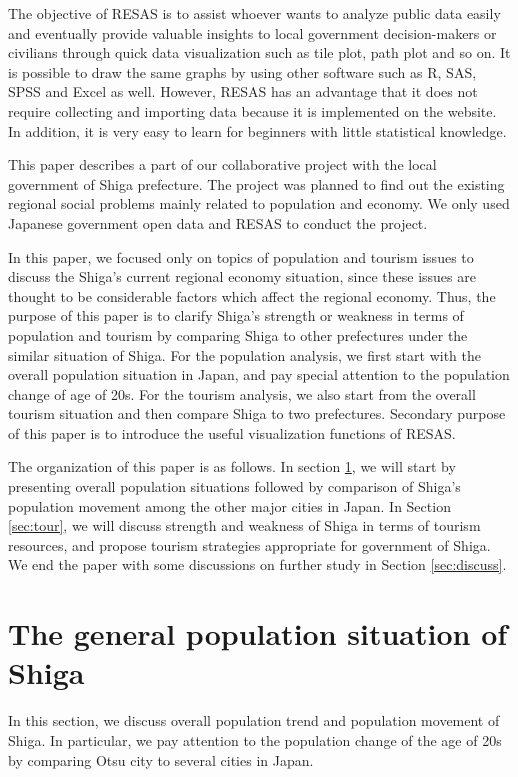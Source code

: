 \documentclass[10pt, conference, compsocconf]{IEEEtran}
\begin{document}
The objective of RESAS is to assist whoever wants to analyze public data easily\cite{resas} and eventually provide valuable insights to local government decision-makers or civilians through quick data visualization such as tile plot, path plot and so on. 
It is possible to draw the same graphs by using other software such as R, SAS, SPSS and Excel as well. However, RESAS has an advantage that it does not require collecting and importing data because it is implemented on the website. In addition, it is very easy to learn for beginners with little statistical knowledge. 

This paper describes a part of our collaborative project with the local government of Shiga prefecture. 
The project was planned to find out the existing regional social problems mainly related to population and economy. We only used Japanese government open data and RESAS to conduct the project.

In this paper, we focused only on topics of population and tourism issues to discuss the Shiga's current regional economy situation, since these issues are thought to be considerable factors 
which affect the regional economy.
Thus, the purpose of this paper is to clarify Shiga's strength or weakness in terms of  population and tourism by comparing Shiga to other prefectures under the similar situation of Shiga.
For the population analysis, we first start with the overall population situation in Japan, and pay special attention to the population change of age of 20s.
For the tourism analysis, we also start from the overall tourism situation and then compare Shiga to two prefectures.
Secondary purpose of this paper is to introduce the useful 
visualization functions of RESAS.



The organization of this paper is as follows. 
In section \ref{sec:pop}, we will start by presenting overall population situations followed by comparison of Shiga's 
population movement
among the other major cities in Japan.
In Section \ref{sec:tour}, we will discuss strength and weakness of Shiga in terms of tourism resources, and propose tourism strategies appropriate for government of Shiga. 
We end the paper with some discussions on further study in Section \ref{sec:discuss}.


\section{The general population situation of Shiga}\label{sec:pop}
In this section, we discuss overall population trend and population movement of Shiga. 
In particular, we pay attention to the population change of the age of 20s by comparing Otsu city to several cities in Japan.
\end{document}

